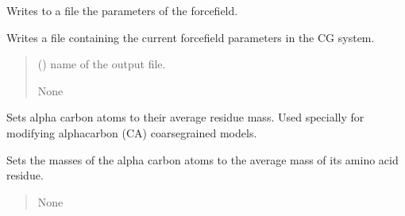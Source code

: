\documentclass[letterpaper,10pt,english]{sphinxmanual}
\begin{document}
\begin{fulllineitems}
\begin{fulllineitems}
\label{\detokenize{modules/system:hps.core.system.dumpForceFieldData}}
\pysigstartsignatures
{}
\pysigstopsignatures
\sphinxAtStartPar
Writes to a file the parameters of the forcefield.

\sphinxAtStartPar
Writes a file containing the current forcefield parameters in the
CG system.
\begin{quote}\begin{description}
\sphinxAtStartPar
{} (\sphinxstyleliteralemphasis{\sphinxupquote{ {[}}}\sphinxstyleliteralemphasis{\sphinxupquote{{]}}}) \textendash{} name of the output file.

\sphinxAtStartPar
None

\end{description}\end{quote}

\end{fulllineitems}


\begin{fulllineitems}
\label{\detokenize{modules/system:hps.core.system.setCAMassPerResidueType}}
\pysigstartsignatures
{}
\pysigstopsignatures
\sphinxAtStartPar
Sets alpha carbon atoms to their average residue mass. Used specially for
modifying alpha\sphinxhyphen{}carbon (CA) coarse\sphinxhyphen{}grained models.

\sphinxAtStartPar
Sets the masses of the alpha carbon atoms to the average mass
of its amino acid residue.
\begin{quote}\begin{description}
\sphinxAtStartPar
None

\end{description}\end{quote}

\end{fulllineitems}


\end{fulllineitems}
\end{document}
